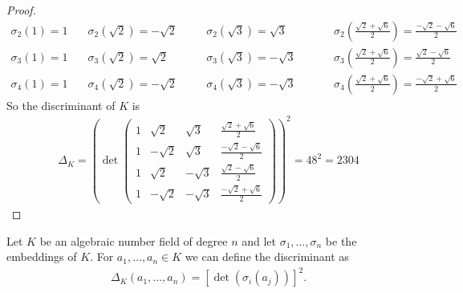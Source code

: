 \begin{example}
\begin{enumerate}
\begin{proof}
\begin{alignat*}
            \sigma_2(1) = 1 & \quad \sigma_2(\sqrt{2}) = -\sqrt{2} && \quad \sigma_2(\sqrt{3}) = \sqrt{3} &&& \quad \sigma_2 \left(\frac{\sqrt{2} + \sqrt{6}}{2}\right) = \frac{-\sqrt{2} - \sqrt{6}}{2} \\
            \sigma_3(1) = 1 & \quad \sigma_3(\sqrt{2}) = \sqrt{2} && \quad \sigma_3(\sqrt{3}) = - \sqrt{3} &&& \quad \sigma_3 \left(\frac{\sqrt{2} + \sqrt{6}}{2}\right) = \frac{\sqrt{2} - \sqrt{6}}{2} \\
            \sigma_4(1) = 1 & \quad \sigma_4(\sqrt{2}) = -\sqrt{2} && \quad \sigma_4(\sqrt{3}) = - \sqrt{3} &&& \quad \sigma_4 \left(\frac{\sqrt{2} + \sqrt{6}}{2}\right) = \frac{-\sqrt{2} + \sqrt{6}}{2}
        \end{alignat*}
        So the discriminant of \(K\) is
        \begin{align*}
            \Delta_K = \left(\det \begin{pmatrix}
                1 & \sqrt{2} & \sqrt{3} & \frac{\sqrt{2} + \sqrt{6}}{2} \\
                1 & -\sqrt{2} & \sqrt{3} & \frac{-\sqrt{2} - \sqrt{6}}{2} \\
                1 & \sqrt{2} & -\sqrt{3} & \frac{\sqrt{2} - \sqrt{6}}{2} \\
                1 & -\sqrt{2} & -\sqrt{3} & \frac{-\sqrt{2} + \sqrt{6}}{2}
            \end{pmatrix}\right)^2
            = 48^2 = 2304
        \end{align*}
    \end{proof}
    \end{enumerate}
\end{example}

\begin{defbox}
    \begin{definition}
        Let \(K\) be an algebraic number field of degree \(n\) and let \(\sigma_1, \ldots, \sigma_n\) be the embeddings of \(K\). For \(a_1, \ldots, a_n \in K\) we can define the discriminant as
        \begin{align*}
            \Delta_K (a_1, \ldots, a_n) = [\det(\sigma_i(a_j))]^2 \text{.}
        \end{align*}
    \end{definition}
\end{defbox}


